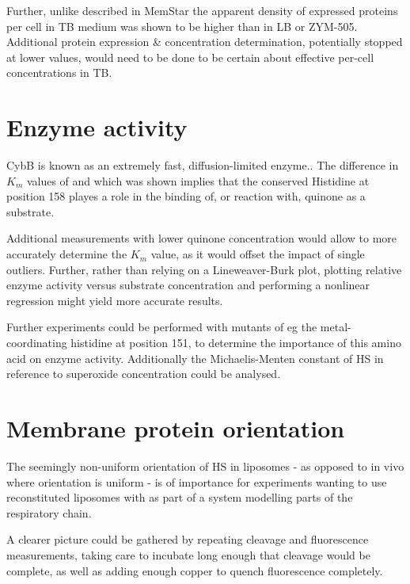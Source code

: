 Further, unlike described in MemStar\cite{memstar} the apparent density of
expressed proteins per cell in TB medium was shown to be higher than in LB or
ZYM-505. Additional protein expression \& concentration determination,
potentially stopped at lower \odbact{} values, would need to be done to be
certain about effective per-cell concentrations in TB.

\section{Enzyme activity}

CybB is known as an extremely fast, diffusion-limited
enzyme.\cite{superoxide_salvaging}. The difference in $K_m$ values of \hsmut{}
and \hs{} which was shown implies that the conserved Histidine at position 158
playes a role in the binding of, or reaction with, quinone as a substrate.

Additional measurements with lower quinone concentration would allow to more
accurately determine the $K_m$ value, as it would offset the impact of single
outliers. Further, rather than relying on a Lineweaver-Burk plot, plotting
relative enzyme activity versus substrate concentration and performing a
nonlinear regression might yield more accurate results.\cite{leskovac2003}

Further experiments could be performed with mutants of eg the
metal-coordinating histidine at position 151, to determine the importance of
this amino acid on enzyme activity. Additionally the Michaelis-Menten constant
of HS in reference to superoxide concentration could be analysed.

\section{Membrane protein orientation}

The seemingly non-uniform orientation of HS in liposomes - as opposed to in
vivo where orientation is uniform - is of importance for experiments wanting to
use reconstituted liposomes with \hs{} as part of a system modelling parts of
the respiratory chain.

A clearer picture could be gathered by repeating cleavage and fluorescence
measurements, taking care to incubate long enough that cleavage would be
complete, as well as adding enough copper to quench fluorescence completely.

